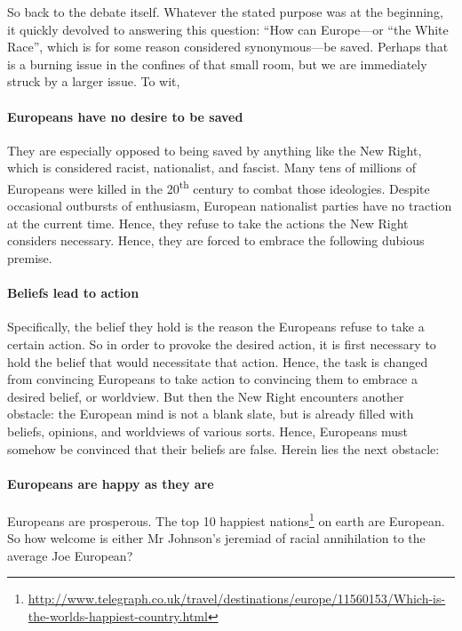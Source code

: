 So back to the debate itself. Whatever the stated purpose was at the beginning, it quickly devolved to answering this question: ``How can Europe---or ``the White Race'', which is for some reason considered synonymous---be saved. Perhaps that is a burning issue in the confines of that small room, but we are immediately struck by a larger issue. To wit,

\paragraph{Europeans have no desire to be saved}


They are especially opposed to being saved by anything like the New Right, which is considered racist, nationalist, and fascist. Many tens of millions of Europeans were killed in the 20\textsuperscript{th} century to combat those ideologies. Despite occasional outbursts of enthusiasm, European nationalist parties have no traction at the current time. Hence, they refuse to take the actions the New Right considers necessary. Hence, they are forced to embrace the following dubious premise.

\paragraph{Beliefs lead to action}

Specifically, the belief they hold is the reason the Europeans refuse to take a certain action. So in order to provoke the desired action, it is first necessary to hold the belief that would necessitate that action. Hence, the task is changed from convincing Europeans to take action to convincing them to embrace a desired belief, or worldview. But then the New Right encounters another obstacle: the European mind is not a blank slate, but is already filled with beliefs, opinions, and worldviews of various sorts. Hence, Europeans must somehow be convinced that their beliefs are false. Herein lies the next obstacle:

\paragraph{Europeans are happy as they are}

Europeans are prosperous. The top 10 happiest nations\footnote{\url{http://www.telegraph.co.uk/travel/destinations/europe/11560153/Which-is-the-worlds-happiest-country.html}} on earth are European. So how welcome is either Mr Johnson's jeremiad of racial annihilation to the average Joe European?

